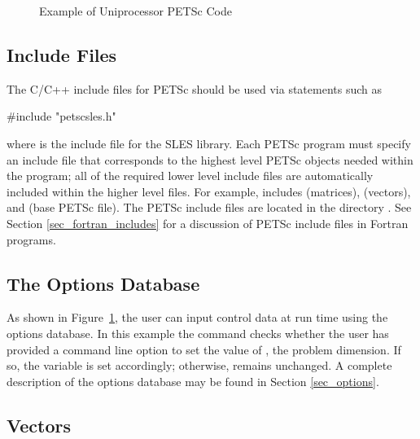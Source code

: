 \begin{figure}[H]
{\footnotesize
{}
}
\caption{Example of Uniprocessor PETSc Code}
\label{fig_example1}
\end{figure}

\subsection*{Include Files}

The C/C++ include files for PETSc should be used via statements such as
\begin{tabbing}
{\footnotesize
   \#include "petscsles.h"
}
\end{tabbing}
where  is the include file for the SLES library.
Each PETSc program must specify an
include file that corresponds to the highest level PETSc objects
needed within the program; all of the required lower level include
files are automatically included within the higher level files.  For
example,  includes  (matrices),
 (vectors), and  (base PETSc file).  
The PETSc include files are located in the directory 
.  See Section \ref{sec_fortran_includes}
for a discussion of PETSc include files in Fortran programs.

\subsection*{The Options Database}

As shown in Figure~\ref{fig_example1}, the user can input control data
at run time using the options database. In this example the command
 checks whether the user has
provided a command line option to set the value of , the
problem dimension.  If so, the variable  is set accordingly;
otherwise,  remains unchanged. A complete description of the
options database may be found in Section \ref{sec_options}.

\subsection*{Vectors}
\label{sec_vecintro}

